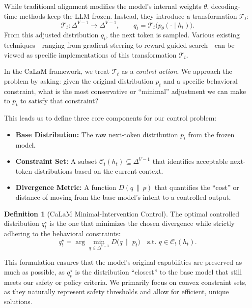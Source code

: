 \documentclass{article}
\theoremstyle{plain}
\theoremstyle{definition}
\newtheorem{definition}[theorem]{Definition}
\theoremstyle{remark}
\begin{document}
While traditional alignment modifies the model's internal weights $\theta$, decoding-time methods keep the LLM frozen. Instead, they introduce a transformation $\mathcal{T}_t$:
\begin{equation}
  \mathcal{T}_t : \Delta^{V-1} \to \Delta^{V-1},
  \qquad
  q_t = \mathcal{T}_t\big(p_\theta(\cdot \mid h_t)\big).
\end{equation}
From this adjusted distribution $q_t$, the next token is sampled. Various existing techniques---ranging from gradient steering to reward-guided search---can be viewed as specific implementations of this transformation $\mathcal{T}_t$.

In the CaLaM framework, we treat $\mathcal{T}_t$ as a \emph{control action}. We approach the problem by asking: given the original distribution $p_t$ and a specific behavioral constraint, what is the most conservative or ``minimal'' adjustment we can make to $p_t$ to satisfy that constraint?

This leads us to define three core components for our control problem:
\begin{itemize}[leftmargin=1.5em]
  \item \textbf{Base Distribution:} The raw next-token distribution $p_t$ from the frozen model.
  \item \textbf{Constraint Set:} A subset $\mathcal{C}_t(h_t) \subseteq \Delta^{V-1}$ that identifies acceptable next-token distributions based on the current context.
  \item \textbf{Divergence Metric:} A function $D(q \,\|\, p)$ that quantifies the ``cost'' or distance of moving from the base model's intent to a controlled output.
\end{itemize}

\begin{definition}[CaLaM Minimal-Intervention Control]
The optimal controlled distribution $q_t^\star$ is the one that minimizes the chosen divergence while strictly adhering to the behavioral constraints:
\begin{equation}
  q_t^\star
  =
  \arg\min_{q \in \Delta^{V-1}} D\big(q \,\|\, p_t\big)
  \quad\text{s.t. } q \in \mathcal{C}_t(h_t).
  \label{eq:calam-core}
\end{equation}
\end{definition}

This formulation ensures that the model's original capabilities are preserved as much as possible, as $q_t^\star$ is the distribution ``closest'' to the base model that still meets our safety or policy criteria. We primarily focus on convex constraint sets, as they naturally represent safety thresholds and allow for efficient, unique solutions.
\end{document}
